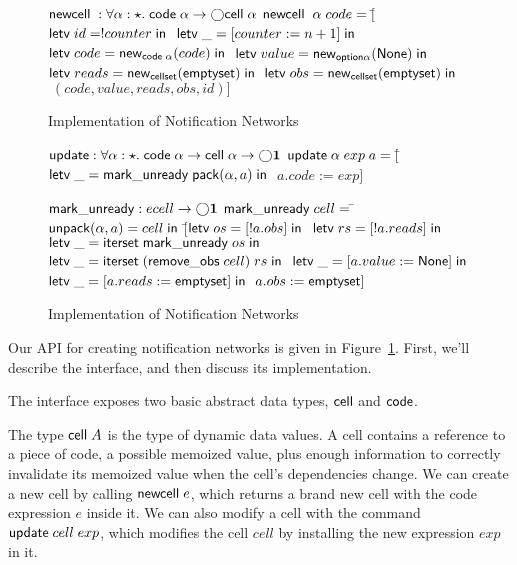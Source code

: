 \begin{figure}
\begin{specification}
$\mathsf{newcell}\; : \forall \alpha:\star.\; \mathsf{code}\;{\alpha} \to \bigcirc{\mathsf{cell}\;{\alpha}}$ \nextline
$\mathsf{newcell}\;\;\alpha\;code = [$\=$\mathsf{letv}\;id = !counter\;\mathsf{in}\;$ \nextline
                                   \>$\mathsf{letv}\;\_ = [counter := n + 1]\;\mathsf{in}\;$ \nextline
                                   \>$\mathsf{letv}\;code = \mathsf{new}_{\mathsf{code}\;{\alpha}}(code)\;\mathsf{in}\;$ \nextline
                                   \>$\mathsf{letv}\;value = \mathsf{new}_{\mathsf{option }{\alpha}}(\mathsf{None})\;\mathsf{in}\;$ \nextline
                                   \>$\mathsf{letv}\;reads = \mathsf{new}_{\mathsf{cellset}}(\mathsf{emptyset})\;\mathsf{in}\;$ \nextline
                                   \>$\mathsf{letv}\;obs = \mathsf{new}_{\mathsf{cellset}}(\mathsf{emptyset})\;\mathsf{in}\;$ \nextline
                                   \>$\; (code, value, reads, obs, id)]$ 
\end{specification}
\caption{Implementation of Notification Networks}
\label{notification-implementation}
\end{figure}

\begin{figure}
\mbox{}
\begin{specification}
\nextline
$\mathsf{update} : \forall \alpha:\star.\; \mathsf{code}\;{\alpha} \to \mathsf{cell}\;{\alpha} \to \bigcirc{\mathbf{1}}$\nextline
$\mathsf{update}\;\alpha\;exp\;a = 
     [$\=$\mathsf{letv}\;\_ = \mathsf{mark\_unready}\;\mathsf{pack}({\alpha}, {a})\;\mathsf{in}\;$ \nextline
       \>$a.code := exp]$ \nextline[1em]

$\mathsf{mark\_unready} : ecell \to \bigcirc{\mathbf{1}}$ \nextline
$\mathsf{mark\_unready}\;cell =\; $\=$\mathsf{unpack}(\alpha, a) = cell\; \mathsf{in}$\nextline
\>  $[$\=$\mathsf{letv}\;os = [!a.obs]\;\mathsf{in}\;$ \nextline
\>     \>$\mathsf{letv}\;rs = [!a.reads]\;\mathsf{in}\;$ \nextline
\>     \>$\mathsf{letv}\;\_ = \mathsf{iterset}\;\mathsf{mark\_unready}\;os\;\mathsf{in}\;$ \nextline
\>     \>$\mathsf{letv}\;\_ = \mathsf{iterset}\;(\mathsf{remove\_obs}\;cell)\;rs\;\mathsf{in}\;$ \nextline
\>     \>$\mathsf{letv}\;\_ = [a.value := \mathsf{None}]\;\mathsf{in}\;$ \nextline
\>     \>$\mathsf{letv}\;\_ = [a.reads := \mathsf{emptyset}]\;\mathsf{in}\;$ \nextline
\>     \>$a.obs   := \mathsf{emptyset}]$ 
\end{specification}
\caption{Implementation of Notification Networks}
\label{notification-implementation-update}
\end{figure}

Our API for creating notification networks is given in
Figure~\ref{notification-implementation}. First, we'll describe
the interface, and then discuss its implementation. 

The interface exposes two basic abstract data types, $\mathsf{cell}$
and $\mathsf{code}$.

The type $\mathsf{cell}\;{A}$ is the type of dynamic data values. A cell
contains a reference to a piece of code, a possible memoized value,
plus enough information to correctly invalidate its memoized value
when the cell's dependencies change. We can create a new cell by
calling $\mathsf{newcell}\; e$, which returns a brand new cell with the
code expression $e$ inside it. We can also modify a cell with 
the command $\mathsf{update}\;cell\;exp$, which modifies the cell
$cell$ by installing the new expression $exp$ in it. 

